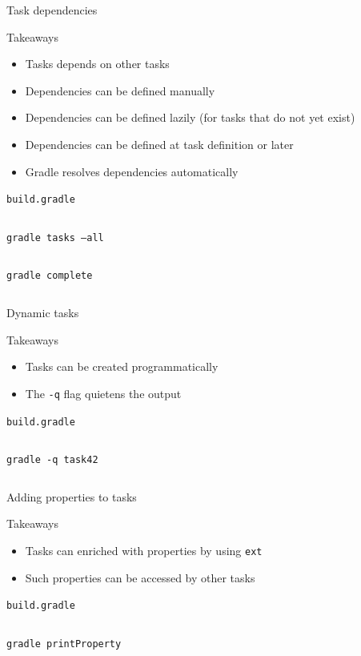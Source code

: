 \documentclass[presentation]{beamer}
\newcommand{\codefile}[4]{
	\begin{block}{\texttt{#2}}
		\inputminted[fontsize=#3,linenos=true,breaklines=true]{#4}{"workspace/#1/#2"}
	\end{block}
}
\newcommand{\groovy}[3]{\codefile{#1}{#2}{#3}{groovy}}
\newcommand{\terminal}[3]{\codefile{#1}{#2}{#3}{text}}
\newcommand{\tinier}{\fontsize{4pt}{5pt}\selectfont}
\begin{document}
\begin{frame}{Task dependencies}
    \begin{block}{Takeaways}
        \begin{itemize}
            \item Tasks depends on other tasks
            \item Dependencies can be defined manually
            \item Dependencies can be defined lazily (for tasks that do not yet exist)
            \item Dependencies can be defined at task definition or later
            \item Gradle resolves dependencies automatically
        \end{itemize}
    \end{block}
    \groovy{04-TaskDependencies}{build.gradle}{\scriptsize}
    \terminal{04-TaskDependencies}{gradle tasks --all}{\tinier}
    \terminal{04-TaskDependencies}{gradle complete}{\normalsize}
\end{frame}

\begin{frame}{Dynamic tasks}
    \begin{block}{Takeaways}
        \begin{itemize}
            \item Tasks can be created programmatically
            \item The \texttt{-q} flag quietens the output
        \end{itemize}
    \end{block}
    \groovy{05-DynamicTasks}{build.gradle}{\scriptsize}
    \terminal{05-DynamicTasks}{gradle -q task42}{\normalsize}
\end{frame}

\begin{frame}{Adding properties to tasks}
    \begin{block}{Takeaways}
        \begin{itemize}
            \item Tasks can enriched with properties by using \texttt{ext}
            \item Such properties can be accessed by other tasks
        \end{itemize}
    \end{block}
    \groovy{06-TaskProperties}{build.gradle}{\scriptsize}
    \terminal{06-TaskProperties}{gradle printProperty}{\normalsize}
\end{frame}
\end{document}
